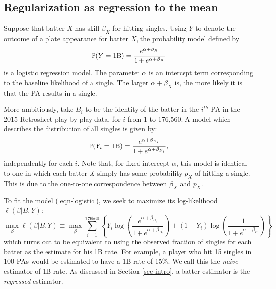 \documentclass[11pt]{article}
\def\l{\left}\def\r{\right}\def\lf{\lfloor}\def\rf{\rfloor}
\begin{document}
\subsection{Regularization as regression to the mean}
\label{sub-regul-as-regre}

Suppose that batter $X$ has skill $\beta_X$ for hitting singles. Using $Y$ to
denote the outcome of a plate appearance for batter $X$, the probability model
defined by
$$\mathbb P(Y = \mbox{1B}) = \frac{e^{\alpha + \beta_X}}{1+e^{\alpha + \beta_X}}$$
is a logistic regression model. The parameter $\alpha$ is an intercept term
corresponding to the baseline likelihood of a single. The larger
$\alpha + \beta_X$ is, the more likely it is that the PA results in a single.

More ambitiously, take $B_i$ to be the identity of the batter in the $i^{th}$
PA in the 2015 Retrosheet play-by-play data, for $i$ from 1 to 176,560. A model
which describes the distribution of all singles is given by:
\begin{equation}
\label{eqn-logistic}
\mathbb P(Y_i = \mbox{1B}) =
    \frac{e^{\alpha + \beta_{B_i}}}{1+e^{\alpha + \beta_{B_i}}},
\end{equation}
independently for each $i$. Note that, for fixed intercept $\alpha$, this model
is identical to one in which each batter $X$ simply has some probability $p_X$
of hitting a single. This is due to the one-to-one correspondence between
$\beta_X$ and $p_X$.

To fit the model (\ref{eqn-logistic}), we seek to maximize its log-likelihood
$\ell(\beta|B, Y)$:
\begin{equation}
\label{eqn-loglike}
\max_\beta\ell(\beta|B, Y)
\equiv
\max_{\beta}\sum_{i=1}^{176560}\l\{Y_i\log\l(\frac{e^{\alpha+\beta_{B_i}}}
    {1+e^{\alpha+\beta_{B_i}}}\r) + (1-Y_i)\log\l(\frac{1}
    {1+e^{\alpha+\beta_{B_i}}}\r)\r\}
\end{equation}
which turns out to be equivalent to using the observed fraction of singles for
each batter as the estimate for his 1B rate. For example, a player who hit 15
singles in 100 PAs would be estimated to have a 1B rate of 15\%. We call this
the {\it naive} estimator of 1B rate. As discussed in Section \ref{sec-intro},
a batter estimator is the {\it regressed} estimator.
\end{document}
